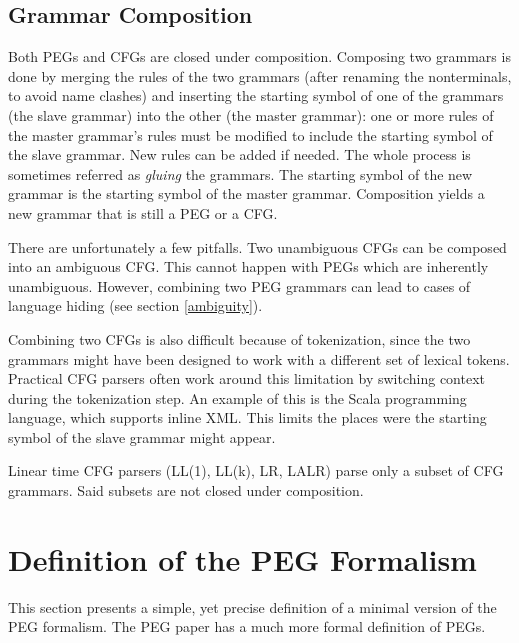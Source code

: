 \subsection{Grammar Composition}
\label{grammar_composition}

Both PEGs and CFGs are closed under composition. Composing two grammars is done
by merging the rules of the two grammars (after renaming the nonterminals, to
avoid name clashes) and inserting the starting symbol of one of the grammars
(the slave grammar) into the other (the master grammar): one or more rules of
the master grammar's rules must be modified to include the starting symbol of
the slave grammar. New rules can be added if needed. The whole process is
sometimes referred as \emph{gluing} the grammars. The starting symbol of the new
grammar is the starting symbol of the master grammar. Composition yields a new
grammar that is still a PEG or a CFG.

There are unfortunately a few pitfalls. Two unambiguous CFGs can be composed
into an ambiguous CFG. This cannot happen with PEGs which are inherently
unambiguous. However, combining two PEG grammars can lead to cases of language
hiding (see section \ref{ambiguity}).

Combining two CFGs is also difficult because of tokenization, since the two
grammars might have been designed to work with a different set of lexical
tokens. Practical CFG parsers often work around this limitation by switching
context during the tokenization step. An example of this is the Scala
programming language, which supports inline XML. \cite{scala_spec} This limits
the places were the starting symbol of the slave grammar might appear.

Linear time CFG parsers (LL(1), LL(k), LR, LALR) parse only a subset of CFG
grammars. Said subsets are not closed under composition.

\section{Definition of the PEG Formalism}
\label{peg_formalism}

This section presents a simple, yet precise definition of a minimal version of
the PEG formalism. The PEG paper \cite{ford2004} has a much more formal
definition of PEGs.

